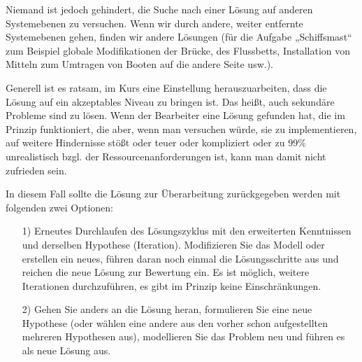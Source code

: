 \documentclass[11pt,a4paper]{article}
\begin{document}
Niemand ist jedoch gehindert, die Suche nach einer Lösung auf anderen
Systemebenen zu versuchen. Wenn wir durch andere, weiter entfernte
Systemebenen gehen, finden wir andere Lösungen (für die Aufgabe „Schiffsmast“
zum Beispiel globale Modifikationen der Brücke, des Flussbetts, Installation
von Mitteln zum Umtragen von Booten auf die andere Seite usw.).

Generell ist es ratsam, im Kurs eine Einstellung herauszuarbeiten, dass die
Lösung auf ein akzeptables Niveau zu bringen ist. Das heißt, auch sekundäre
Probleme sind zu lösen.  Wenn der Bearbeiter eine Lösung gefunden hat, die im
Prinzip funktioniert, die aber, wenn man versuchen würde, sie zu
implementieren, auf weitere Hindernisse stößt oder teuer oder kompliziert oder
zu 99\% unrealistisch bzgl. der Ressourcenanforderungen ist, kann man damit
nicht zufrieden sein.

In diesem Fall sollte die Lösung zur Überarbeitung zurückgegeben werden mit
folgenden zwei Optionen:
\begin{itemize}
\item [1)] Erneutes Durchlaufen des Lösungszyklus mit den erweiterten
  Kenntnissen und derselben Hypothese (Iteration).  Modifizieren Sie das
  Modell oder erstellen ein neues, führen daran noch einmal die
  Lösungsschritte aus und reichen die neue Lösung zur Bewertung ein. Es ist
  möglich, weitere Iterationen durchzuführen, es gibt im Prinzip keine
  Einschränkungen.
\enlargethispage{-1em}
\item [2)] Gehen Sie anders an die Lösung heran, formulieren Sie eine neue
  Hypothese (oder wählen eine andere aus den vorher schon aufgestellten
  mehreren Hypothesen aus), modellieren Sie das Problem neu und führen es als
  neue Lösung aus.
\end{itemize}
\end{document}
